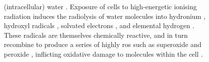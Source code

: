 \documentclass[
twoside,
openright,
titlepage,
numbers=noenddot,
headinclude,
fleqn,
a4paper,
footinclude=true,
cleardoublepage=empty,
abstractoff,
BCOR=5mm,
paper=a4,
fontsize=11pt,
british,ngerman,american,
]{scrreprt}
\begin{document}
\begin{figure}
{    (intracellular) water \protect{}.  Exposure of cells
    to high-energetic ionising radiation induces the radiolysis of
    water molecules into hydronium \protect{},
    hydroxyl radicals \protect{}, solvated electrons
    \protect{}, and elemental hydrogen
    \protect{}.  These radicals are themselves chemically
    reactive, and in turn recombine to produce a series of highly
    \acf{ros} such as superoxide \protect{} and peroxide
    \protect{}, inflicting oxidative damage to molecules
    within the cell \cite{Arena1987}. }
  \label{fig:radiolysis}
\end{figure}

\end{document}
